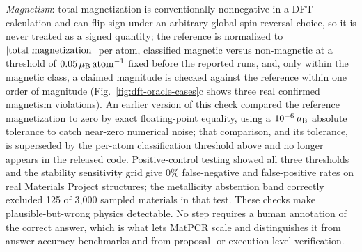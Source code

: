 \documentclass[pdflatex,sn-nature]{sn-jnl}
\begin{document}
\emph{Magnetism}: total magnetization is conventionally nonnegative in a DFT calculation
and can flip sign under an arbitrary global spin-reversal choice, so it is never treated as
a signed quantity; the reference is normalized to $|{\rm total\ magnetization}|$ per atom,
classified magnetic versus non-magnetic at a threshold of
$0.05\,\mu_{\rm B}\,{\rm atom}^{-1}$ fixed before the reported runs, and, only within the magnetic class, a claimed
magnitude is checked against the reference within one order of magnitude
(Fig.~\ref{fig:dft-oracle-cases}c shows three real confirmed magnetism violations). An earlier
version of this check compared the reference magnetization to zero by exact
floating-point equality, using a $10^{-6}\,\mu_{\rm B}$ absolute tolerance to catch
near-zero numerical noise; that comparison, and its tolerance, is superseded by the
per-atom classification threshold above and no longer appears in the released code.
Positive-control testing showed all
three thresholds and the stability sensitivity grid give 0\% false-negative and
false-positive rates on real Materials Project structures; the metallicity abstention band
correctly excluded 125 of 3{,}000 sampled materials in that test. These checks make plausible-but-wrong physics detectable.
No step requires a human annotation of the correct answer, which is what lets MatPCR
scale and distinguishes it from answer-accuracy benchmarks and from proposal- or
execution-level verification.
\end{document}
